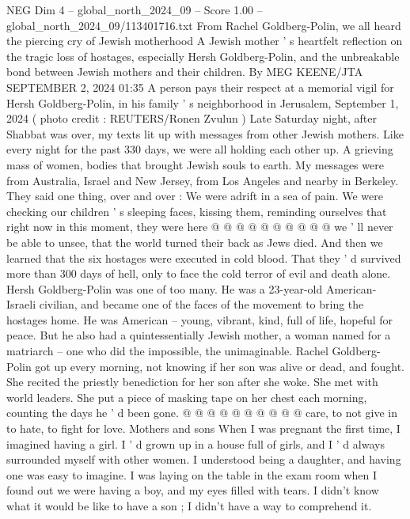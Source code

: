 \begin{textsample}{NEG Dim 4 – global\_north\_2024\_09 – Score 1.00 – global\_north\_2024\_09/113401716.txt}  \label{ex:f4_neg_148}
From Rachel Goldberg-Polin, we all heard the piercing cry of Jewish motherhood A Jewish mother ' s heartfelt reflection on the tragic loss of hostages, especially Hersh Goldberg-Polin, and the unbreakable bond between Jewish mothers and their children.
By MEG KEENE/JTA SEPTEMBER 2, 2024 01:35 A person pays their respect at a memorial vigil for Hersh Goldberg-Polin, in his family ' s neighborhood in Jerusalem, September 1, 2024 ( photo credit : REUTERS/Ronen Zvulun ) Late Saturday night, after Shabbat was over, my texts lit up with messages from other Jewish mothers.
Like every night for the past 330 days, we were all holding each other up.
A grieving mass of women, bodies that brought Jewish souls to earth.
My messages were from Australia, Israel and New Jersey, from Los Angeles and nearby in Berkeley.
They said one thing, over and over : We were adrift in a sea of pain.
We were checking our children ' s sleeping faces, kissing them, reminding ourselves that right now in this moment, they were here @ @ @ @ @ @ @ @ @ @ we ' ll never be able to unsee, that the world turned their back as Jews died.
And then we learned that the six hostages were executed in cold blood.
That they ' d survived more than 300 days of hell, only to face the cold terror of evil and death alone.
Hersh Goldberg-Polin was one of too many.
He was a 23-year-old American-Israeli civilian, and became one of the faces of the movement to bring the hostages home.
He was American -- young, vibrant, kind, full of life, hopeful for peace.
But he also had a quintessentially Jewish mother, a woman named for a matriarch -- one who did the impossible, the unimaginable.
Rachel Goldberg-Polin got up every morning, not knowing if her son was alive or dead, and fought.
She recited the priestly benediction for her son after she woke.
She met with world leaders.
She put a piece of masking tape on her chest each morning, counting the days he ' d been gone. @ @ @ @ @ @ @ @ @ @ care, to not give in to hate, to fight for love.
Mothers and sons When I was pregnant the first time, I imagined having a girl.
I ' d grown up in a house full of girls, and I ' d always surrounded myself with other women.
I understood being a daughter, and having one was easy to imagine.
I was laying on the table in the exam room when I found out we were having a boy, and my eyes filled with tears.
I didn't know what it would be like to have a son ; I didn't have a way to comprehend it.

\end{textsample}
